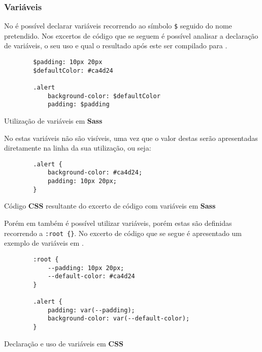 \subsubsection{Variáveis}

No \textbf{} é possível declarar variáveis recorrendo ao símbolo \verb|$| seguido do nome pretendido. Nos excertos de código que se seguem é possível analisar a declaração de variáveis, o seu uso e qual o resultado após este ser compilado para \textbf{}.

\begin{longlisting}
	\begin{verbatim}
		$padding: 10px 20px
		$defaultColor: #ca4d24

		.alert
			background-color: $defaultColor
			padding: $padding
	\end{verbatim}
	\caption{Utilização de variáveis em \textbf{Sass}}
\end{longlisting}

No \textbf{} estas variáveis não são visíveis, uma vez que o valor destas serão apresentadas diretamente na linha da sua utilização, ou seja:

\begin{longlisting}
	\begin{verbatim}
		.alert {
			background-color: #ca4d24;
			padding: 10px 20px;
		}
	\end{verbatim}
	\caption{Código \textbf{CSS} resultante do excerto de código com variáveis em \textbf{Sass}}
\end{longlisting}

Porém em \textbf{} também é possível utilizar variáveis, porém estas são definidas recorrendo a \verb|:root {}|. No excerto de código que se segue é apresentado um exemplo de variáveis em \textbf{}.

\begin{longlisting}
	\begin{verbatim}
		:root {
			--padding: 10px 20px;
			--default-color: #ca4d24
		}

		.alert {
			padding: var(--padding);
			background-color: var(--default-color);
		}
	\end{verbatim}
	\caption{Declaração e uso de variáveis em \textbf{CSS}}
\end{longlisting}